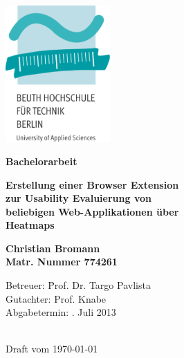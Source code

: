 %
%

\thispagestyle{empty}

\begin{center}

\vspace*{-1cm}

\includegraphics[width=0.3\textwidth]{./images/beuth_logo}

\vspace{2cm}

{\Large \textbf{Bachelorarbeit}}\\ 

\vspace{1cm}

{\Huge \textbf{Erstellung einer Browser Extension}}\\
\vspace*{3mm}
{\Huge \textbf{zur Usability Evaluierung von}}\\
\vspace*{3mm}
{\Huge \textbf{beliebigen Web-Applikationen über}}\\
\vspace*{3mm}
{\Huge \textbf{Heatmaps}}\\

\vspace{2cm}

{\Large \textbf{Christian Bromann}}\\ 
\textbf{Matr. Nummer 774261}

\vspace{2cm}

\parbox{1cm}{
\begin{large}
\begin{tabbing}
Betreuer: \hspace{1.5cm}\=Prof. Dr. Targo Pavlista\\[1mm]
Gutachter: \>Prof. Knabe\\[2mm]
Abgabetermin: . Juli 2013\\
\end{tabbing}
\end{large}}\\

Draft vom \today 			%

\end{center}

\newpage
